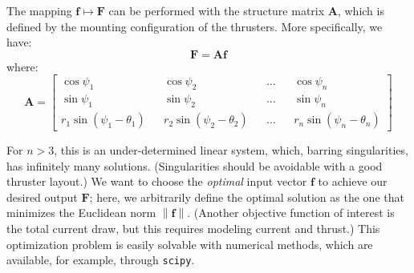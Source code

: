 \documentclass{article}
\renewcommand{\vec}[1]{\mathbf{#1}}
\newcommand{\norm}[1]{\left\lVert#1\right\rVert}
\begin{document}
The mapping $\vec{f} \mapsto \vec{F}$ can be performed with the structure matrix $\vec{A}$, which is defined by the mounting configuration of the thrusters. More specifically, we have:
\begin{equation}
  \vec{F} = \vec{A}\vec{f}
\end{equation}
where:
\begin{equation}
  \vec{A} =
  \begin{bmatrix}
    \cos\psi_1 && \cos\psi_2 && \dots && \cos\psi_n \\
    \sin\psi_1 && \sin\psi_2 && \dots && \sin\psi_n \\
    r_1\sin(\psi_1 - \theta_1) && r_2\sin(\psi_2 - \theta_2) && \dots && r_n\sin(\psi_n - \theta_n)
  \end{bmatrix}
\end{equation}

For $n > 3$, this is an under-determined linear system, which, barring singularities, has infinitely many solutions. (Singularities should be avoidable with a good thruster layout.) We want to choose the \emph{optimal} input vector $\vec{f}$ to achieve our desired output $\vec{F}$; here, we arbitrarily define the optimal solution as the one that minimizes the Euclidean norm $\norm{\vec{f}}$. (Another objective function of interest is the total current draw, but this requires modeling current and thrust.) This optimization problem is easily solvable with numerical methods, which are available, for example, through \verb|scipy|.
\end{document}
